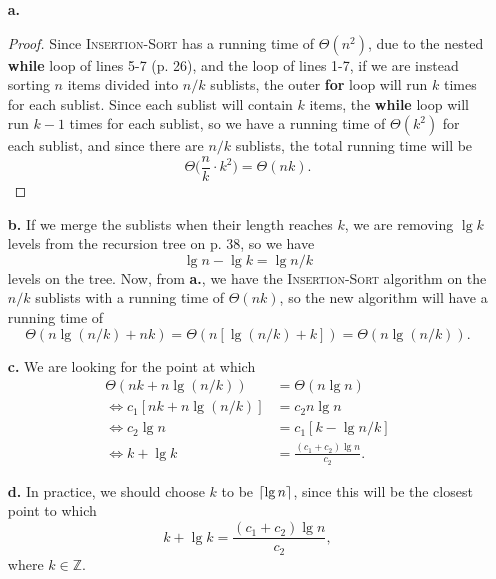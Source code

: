 
\begin{itemize}
    \item[\textbf{a.}]
        \begin{proof}
            Since \textsc{Insertion-Sort} has a running time of $\Theta(n^2)$,
            due to the nested \textbf{while} loop of lines 5-7 (p. 26), and the
            loop of lines 1-7, if we are instead sorting $n$ items divided into
            $n/k$ sublists, the outer \textbf{for} loop will run $k$ times for
            each sublist. Since each sublist will contain $k$ items, the \textbf{while} 
            loop will run $k - 1$ times for each sublist, so we have a running time
            of $\Theta(k^2)$ for each sublist, and since there are $n/k$ sublists, 
            the total running time will be
            \[
                \Theta\biggl(\frac{n}{k}\cdot k^2\biggr) = \Theta(nk).
            \]
        \end{proof}
    \item[\textbf{b.}] If we merge the sublists when their length reaches $k$, we are
        removing $\lg{k}$ levels from the recursion tree on p. 38, so we have
        \[
            \lg{n} - \lg{k} = \lg{n/k}
        \]
        levels on the tree. Now, from \textbf{a.}, we have the \textsc{Insertion-Sort}
        algorithm on the $n/k$ sublists with a running time of $\Theta(nk)$, so the
        new algorithm will have a running time of
        \[
            \Theta(n\lg{(n/k)} + nk) = \Theta(n[\lg{(n/k)} + k]) = \Theta(n\lg{(n/k)}).
        \]
    \item[\textbf{c.}] We are looking for the point at which 
        \begin{equation*}
            \begin{split}
                \Theta(nk + n\lg{(n/k)}) &= \Theta(n\lg{n}) \\ 
                \Leftrightarrow c_1[nk + n\lg{(n/k)}] &= c_2n\lg{n} \\
                \Leftrightarrow c_2\lg{n} &= c_1[k - \lg{n/k}] \\
                \Leftrightarrow k + \lg{k} &= \frac{(c_1 + c_2)\lg{n}}{c_2}.
            \end{split}
        \end{equation*}
    \item[\textbf{d.}] In practice, we should choose $k$ to be $\lceil\lg{n}\rceil$, since 
        this will be the closest point to which 
        \[
            k + \lg{k} = \frac{(c_1 + c_2)\lg{n}}{c_2},
        \]
        where $k \in \mathbb{Z}$.
\end{itemize}
